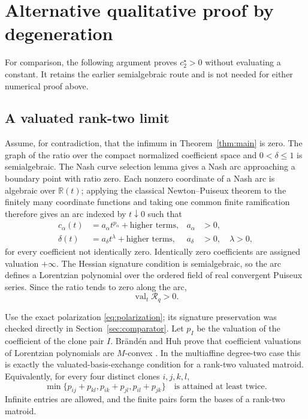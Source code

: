 \documentclass[11pt]{article}
\theoremstyle{remark}
\newcommand{\R}{\mathbb{R}}
\newcommand{\val}{\operatorname{val}}
\begin{document}
\section{Alternative qualitative proof by degeneration}
\label{sec:alternative}

For comparison, the following argument proves $c_2^\star>0$ without
evaluating a constant.  It retains the earlier semialgebraic route and is
not needed for either numerical proof above.

\subsection{A valuated rank-two limit}

Assume, for contradiction, that the infimum in
Theorem~\ref{thm:main} is zero.  The graph of the ratio over the compact
normalized coefficient space and $0<\delta\leq1$ is semialgebraic.
The Nash curve selection lemma
\cite[Proposition~8.1.13]{BochnakCosteRoy1998} gives a Nash arc approaching a
boundary point with ratio zero.  Each nonzero coordinate of a Nash arc is
algebraic over $\R(t)$; applying the classical Newton--Puiseux theorem to the
finitely many coordinate functions and taking one common finite ramification
therefore gives an arc indexed by $t\downarrow0$ such
that
\begin{align*}
 c_\alpha(t)&=a_\alpha t^{p_\alpha}+\text{higher terms},
 &a_\alpha&>0,\\
 \delta(t)&=a_\delta t^\lambda+\text{higher terms},
 &a_\delta&>0,\quad\lambda>0,
\end{align*}
for every coefficient not identically zero.  Identically zero coefficients
are assigned valuation $+\infty$.  The Hessian signature condition is
semialgebraic, so the arc defines a Lorentzian polynomial over the ordered
field of real convergent Puiseux series.  Since the ratio tends to zero along
the arc,
\begin{equation}
 \val_t\mathcal R_q>0.
 \label{eq:positive-valuation}
\end{equation}

Use the exact polarization \eqref{eq:polarization}; its signature preservation
was checked directly in Section~\ref{sec:comparator}.  Let $p_I$ be the
valuation of the coefficient of the clone pair $I$.  Br\"and\'en and Huh prove
that coefficient valuations of
Lorentzian polynomials are $M$-convex
\cite[Corollary~3.28]{BrandenHuh2020}.  In the multiaffine degree-two case this
is exactly the valuated-basis-exchange condition for a rank-two valuated
matroid.  Equivalently, for every four distinct clones $i,j,k,l$,
\begin{equation}
 \min\{p_{ij}+p_{kl},p_{ik}+p_{jl},p_{il}+p_{jk}\}
 \quad\text{is attained at least twice}.
 \label{eq:tropical-plucker}
\end{equation}
Infinite entries are allowed, and the finite pairs form the bases of a
rank-two matroid.
\end{document}
